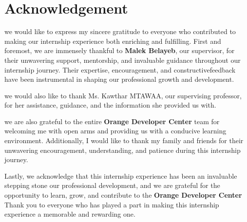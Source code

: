 \chapter*{Acknowledgement}

we would like to express my sincere gratitude to everyone who contributed
to making our internship experience both enriching and fulfilling.
First and foremost, we are immensely thankful to \textbf{Malek Belayeb},
our supervisor, for their unwavering support, mentorship, and invaluable
guidance throughout our internship journey. Their expertise, encouragement,
and constructivefeedback have been instrumental in shaping our professional growth
and development.\bigskip

we would also like to thank Ms. Kawthar MTAWAA,
 our supervising professor, 
 for her assistance, guidance, and the information she provided us with. \bigskip

we are also grateful to the entire \textbf{Orange Developer Center} team for welcoming me with open arms
and providing us with a conducive learning environment.
Additionally, I would like to thank my family and friends for their unwavering encouragement,
understanding, and patience during this internship journey.\bigskip

Lastly, we acknowledge that this internship experience has been an invaluable stepping stone our professional development, and we are grateful for the opportunity to learn, grow,
and contribute to the \textbf{Orange Developer Center} Thank you to everyone
who has played a part in making this internship experience a memorable and rewarding one.
